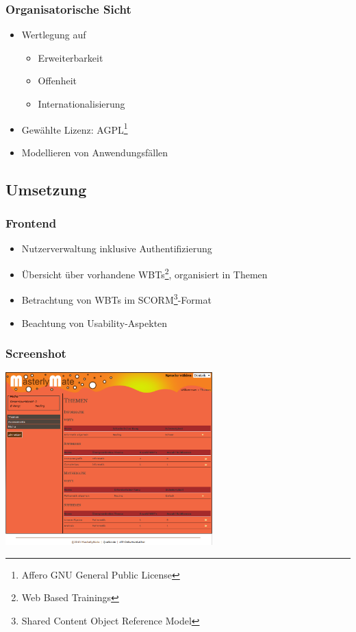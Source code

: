 \documentclass[xcolor=dvipsnames, utf8]{beamer}
\begin{document}
\begin{frame}
  \frametitle{Organisatorische Sicht}
  \begin{itemize}
  \item Wertlegung auf\begin{itemize}
    \item Erweiterbarkeit
    \item Offenheit
    \item Internationalisierung
  \end{itemize}
  \item Gewählte Lizenz: AGPL\footnote{Affero GNU General Public License}
  \item Modellieren von Anwendungsfällen
\end{itemize}
\end{frame}

\subsection{Umsetzung}
\begin{frame}
\frametitle{Frontend}
\begin{itemize}
  \item Nutzerverwaltung inklusive Authentifizierung
  \item Übersicht über vorhandene WBTs\footnote{Web Based Trainings},
  organisiert in Themen
  \item Betrachtung von WBTs im SCORM\footnote{Shared Content Object
  Reference Model}-Format
  \item Beachtung von Usability-Aspekten
  \end{itemize}
  \end{frame}
  
\begin{frame}
\frametitle{Screenshot}
\centering
\includegraphics[width=0.6\textwidth]{ScreenshotThemen.PNG}
\end{frame}
  
\end{document}
